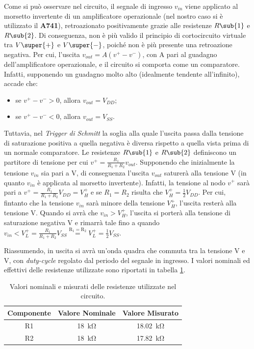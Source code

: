 \noindent
Come si può osservare nel circuito, il segnale di ingresso $v_{in}$ viene applicato al morsetto invertente di un amplificatore operazionale (nel nostro caso si è utilizzato il \textbf{\textmu A741}), retroazionato positivamente grazie alle resistenze $R\sub{1}$ e $R\sub{2}$. Di conseguenza, non è più valido il principio di cortocircuito virtuale tra $V\super{+}$ e $V\super{-}$, poiché non è più presente una retroazione negativa. Per cui, l'uscita $v_{out}=A(v^+-v^-)$, con A pari al guadagno dell'amplificatore operazionale, e il circuito si comporta come un comparatore. Infatti, supponendo un guadagno molto alto (idealmente tendente all'infinito), accade che:
\begin{itemize}
	\item se $v^+-v^->0$, allora $v_{out}=V_{DD}$;
	\item se $v^+-v^-<0$, allora $v_{out}=V_{SS}$.
\end{itemize}
Tuttavia, nel \textit{Trigger di Schmitt} la soglia alla quale l'uscita passa dalla tensione di saturazione positiva a quella negativa è diversa rispetto a quella vista prima di un normale comparatore. Le resistenze $R\sub{1}$ e $R\sub{2}$ definiscono un partitore di tensione per cui $v^+=\frac{R_1}{R_1+R_2}v_{out}$. Supponendo che inizialmente la tensione $v_{in}$ sia pari a V, di conseguenza l'uscita $v_{out}$ saturerà alla tensione V (in quanto $v_{in}$ è applicata al morsetto invertente). Infatti, la tensione al nodo $v^+$ sarà pari a $v^+=\frac{R_1}{R_1+R_2}V_{DD}=V_H^+$ e se $R_1=R_2$ risulta che $V_H^+=\frac{1}{2}V_{DD}$. Per cui, fintanto che la tensione $v_{in}$ sarà minore della tensione $V_H^+$, l'uscita resterà alla tensione V. Quando si avrà che $v_{in}>V_H^+$, l'uscita si porterà alla tensione di saturazione negativa V e rimarrà tale fino a quando $v_{in}<V_L^+=\frac{R_1}{R_1+R_2}V_{SS}\overset{\mathrm{R_1=R_2}}{=}V_L^+=\frac{1}{2}V_{SS}$. 

\noindent
Riassumendo, in uscita si avrà un'onda quadra che commuta tra la tensione V e V, con \textit{duty-cycle} regolato dal periodo del segnale in ingresso. 
I valori nominali ed effettivi delle resistenze utilizzate sono riportati in tabella \ref{tab:valori_componenti_2}.

\def\arraystretch{1.3}
\begin{table}[h]
	\centering
	\begin{tabular}{|c|c|c|}
		\hline
		Componente	& Valore Nominale & Valore Misurato \\ \hline
		R1 &\SI{18}{\kilo\ohm} & \SI{18,02}{\kilo\ohm} \\ \hline
		R2 &\SI{18}{\kilo\ohm} & \SI{17,82}{\kilo\ohm} \\ \hline
	\end{tabular}
	\caption{Valori nominali e misurati delle resistenze utilizzate nel circuito.}
	\label{tab:valori_componenti_2}
\end{table}

